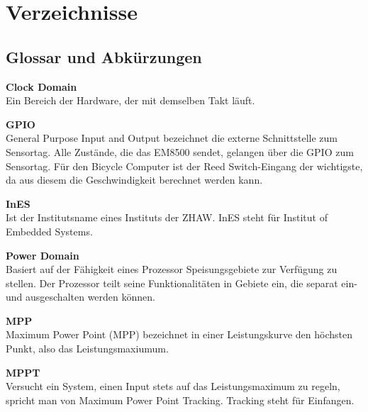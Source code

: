 \chapter{Verzeichnisse}




\renewcommand{\bibsection}{\section{\refname}}  %
\makeatletter
\makeatother






\section{Glossar und Abkürzungen}\label{glossar}

\textbf{Clock Domain}\\
\forceindent Ein Bereich der Hardware, der mit demselben Takt läuft.

\textbf{GPIO}\\
\forceindent General Purpose Input and Output bezeichnet die externe Schnittstelle zum Sensortag. Alle Zustände, die das EM8500 sendet, gelangen über die GPIO zum Sensortag. Für den Bicycle Computer ist der Reed Switch-Eingang der wichtigste, da aus diesem die Geschwindigkeit berechnet werden kann.

\textbf{InES}\\
\forceindent Ist der Institutsname eines Instituts der ZHAW. InES steht für Institut of Embedded Systems.

\textbf{Power Domain}\\
\forceindent Basiert auf der Fähigkeit eines Prozessor Speisungsgebiete zur Verfügung zu stellen. Der Prozessor teilt seine Funktionalitäten in Gebiete ein, die separat ein- und ausgeschalten werden können.

\textbf{MPP}\\
\forceindent Maximum Power Point (MPP) bezeichnet in einer Leistungskurve den höchsten Punkt, also das Leistungsmaxiumum.

\textbf{MPPT}\\
\forceindent Versucht ein System, einen Input stets auf das Leistungsmaximum zu regeln, spricht man von Maximum Power Point Tracking. Tracking steht für Einfangen.


